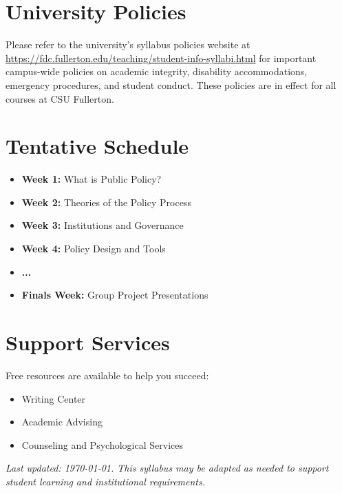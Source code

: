 \documentclass[11pt]{article}
\begin{document}
\section*{University Policies}
Please refer to the university’s syllabus policies website at 
\href{https://fdc.fullerton.edu/teaching/student-info-syllabi.html}{\url{https://fdc.fullerton.edu/teaching/student-info-syllabi.html}} 
for important campus-wide policies on academic integrity, disability accommodations, emergency procedures, and student conduct. These policies are in effect for all courses at CSU Fullerton.

\section*{Tentative Schedule}
\begin{itemize}[leftmargin=1.5em]
  \item \textbf{Week 1:} What is Public Policy?
  \item \textbf{Week 2:} Theories of the Policy Process
  \item \textbf{Week 3:} Institutions and Governance
  \item \textbf{Week 4:} Policy Design and Tools
  \item \textbf{...}
  \item \textbf{Finals Week:} Group Project Presentations
\end{itemize}

\section*{Support Services}
Free resources are available to help you succeed:
\begin{itemize}[leftmargin=1.5em]
  \item Writing Center
  \item Academic Advising
  \item Counseling and Psychological Services
\end{itemize}

\vfill
\noindent\textit{Last updated: \today. This syllabus may be adapted as needed to support student learning and institutional requirements.}
\end{document}
